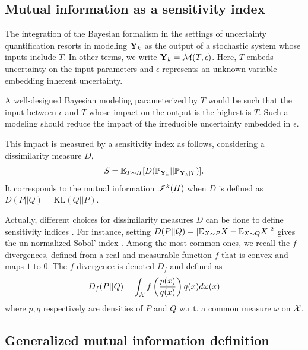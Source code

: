 \subsection{Mutual information as a sensitivity index}

The integration of the Bayesian formalism in the settings of uncertainty quantification resorts in modeling $\mathbf{Y}_k$ as the output of a stochastic system whose inputs include $T$. In other terms, we write $\mathbf{Y}_k=\mathcal{M}(T,\epsilon)$. Here, $T$ embeds uncertainty on  the input parameters and $\epsilon$ represents an unknown variable embedding inherent uncertainty. %

A well-designed Bayesian modeling parameterized by $T$ would be such that the input between $\epsilon$ and $T$ whose impact on the output
is the highest is $T$. Such a modeling should reduce the impact of the irreducible uncertainty embedded in $\epsilon$.

This impact is measured by a sensitivity index as follows, considering a dissimilarity measure $D$, 
    \begin{equation}
        S = \mathbb{E}_{T\sim\varPi}[ D(\mathbb{P}_{\mathbf{Y}_k}||\mathbb{P}_{\mathbf{Y}_k|T}) ].
    \end{equation}
It corresponds to the mutual information $\mathscr{I}^k(\varPi)$ when $D$ is defined as $D(P||Q)=\text{KL}(Q||P)$.

Actually, different choices for dissimilarity measures $D$ can be done to define sensitivity indices \citep{da_veiga_global_2015}. For instance, setting $D(P||Q)=|\mathbb{E}_{X\sim P}X-\mathbb{E}_{X\sim Q}X|^2$ gives the un-normalized Sobol’ index \citep{sobol_sensitivity_1993}.
Among the most common ones, we recall the $f$-divergences, defined from a real and measurable function $f$ that is convex and maps $1$ to $0$. The $f$-divergence is denoted $D_f$ and defined as 
    \begin{equation}
        D_f(P||Q) = \int_{\mathcal{X}} f\left(\frac{p(x)}{q(x)}\right) q(x) d\omega(x)
    \end{equation}
where $p,q$ respectively are densities of $P$ and $Q$  w.r.t. a common measure $\omega$ on $\mathcal{X}$.







\subsection{Generalized mutual information definition}


